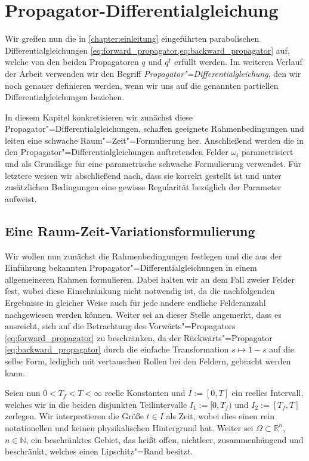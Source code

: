 \documentclass[../main.tex]{subfiles}
\begin{document}
\chapter{Propagator-Differentialgleichung} %
\label{chapter:propagator_differentialgleichung}

Wir greifen nun die in \cref{chapter:einleitung} eingeführten parabolischen Differentialgleichungen \cref{eq:forward_propagator,eq:backward_propagator} auf, welche von den beiden Propagatoren $q$ und $q^{\dagger}$ erfüllt werden.
Im weiteren Verlauf der Arbeit verwenden wir den Begriff \emph{Propagator"=Differentialgleichung}, den wir noch genauer definieren werden, wenn wir uns
auf die genannten partiellen Differentialgleichungen beziehen.

In diesem Kapitel konkretisieren wir zunächst diese Propagator"=Differentialgleichungen, schaffen geeignete Rahmenbedingungen und leiten eine schwache Raum"=Zeit"=Formulierung her.
Anschließend werden die in den Propagator"=Differentialgleichungen auftretenden Felder $\omega_{i}$ parametrisiert und als Grundlage für eine parametrische schwache Formulierung verwendet.
Für letztere weisen wir abschließend nach, dass sie korrekt gestellt ist und unter zusätzlichen Bedingungen eine gewisse Regularität bezüglich der Parameter aufweist.


\section{Eine Raum-Zeit-Variationsformulierung}
\label{section:raum_zeit_variationsformulierung}

Wir wollen nun zunächst die Rahmenbedingungen festlegen und die aus der Einführung bekannten Propagator"=Differentialgleichungen in einem allgemeineren Rahmen formulieren.
Dabei halten wir an dem Fall zweier Felder fest, wobei diese Einschränkung nicht notwendig ist, da die nachfolgenden Ergebnisse in gleicher Weise auch für jede andere endliche Felderanzahl nachgewiesen werden können.
Weiter sei an dieser Stelle angemerkt, dass es ausreicht, sich auf die Betrachtung des Vorwärts"=Propagators \cref{eq:forward_propagator} zu beschränken, da der Rückwärts"=Propagator \cref{eq:backward_propagator} durch die einfache Transformation $s \mapsto 1 - s$ auf die selbe Form, lediglich mit vertauschen Rollen bei den Feldern, gebracht werden kann.

Seien nun $0 < T_{f} < T < \infty$ reelle Konstanten und $I := [0, T]$ ein reelles Intervall, welches wir in die beiden disjunkten Teilintervalle $I_{1} := [0, T_{f})$ und $I_{2} := [T_{f}, T]$ zerlegen.
Wir interpretieren die Größe $t \in I$ als Zeit, wobei dies einen rein notationellen und keinen physikalischen Hintergrund hat.
Weiter sei $\Omega \subset \mathbb{R}^{n}$, $n \in \mathbb{N}$, ein beschränktes Gebiet, das heißt offen, nichtleer, zusammenhängend und beschränkt, welches einen Lipschitz"=Rand besitzt.
\end{document}
